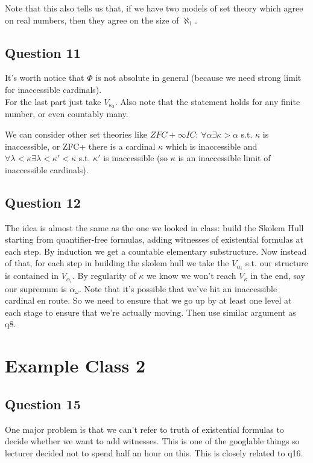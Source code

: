 \documentclass[a4paper]{article}
\begin{document}
Note that this also tells us that, if we have two models of set theory which agree on real numbers, then they agree on the size of $\aleph_1$.

\subsection{Question 11}
It's worth notice that $\Phi$ is not absolute in general (because we need strong limit for inaccessible cardinals).\\
For the last part just take $V_{\kappa_2}$. Also note that the statement holds for any finite number, or even countably many.

We can consider other set theories like $ZFC+\infty IC$: $\forall \alpha \exists \kappa > \alpha$ s.t. $\kappa$ is inaccessible, or ZFC+ there is a cardinal $\kappa$ which is inaccessible and $\forall \lambda < \kappa \exists \lambda < \kappa' < \kappa$ s.t. $\kappa'$ is inaccessible (so $\kappa$ is an inaccessible limit of inaccessible cardinals).

\subsection{Question 12}
The idea is almost the same as the one we looked in class: build the Skolem Hull starting from quantifier-free formulas, adding witnesses of existential formulas at each step. By induction we get a countable elementary substructure. Now instead of that, for each step in building the skolem hull we take the $V_{\alpha_i}$ s.t. our structure is contained in $V_{\alpha_i}$. By regularity of $\kappa$ we know we won't reach $V_\kappa$ in the end, say our supremum is $\alpha_\omega$. Note that it's possible that we've hit an inaccessible cardinal en route. So we need to ensure that we go up by at least one level at each stage to ensure that we're actually moving. Then use similar argument as q8.

\newpage

\section{Example Class 2}

\subsection{Question 15}

One major problem is that we can't refer to truth of existential formulas to decide whether we want to add witnesses. This is one of the googlable things so lecturer decided not to spend half an hour on this. This is closely related to q16.
\end{document}

